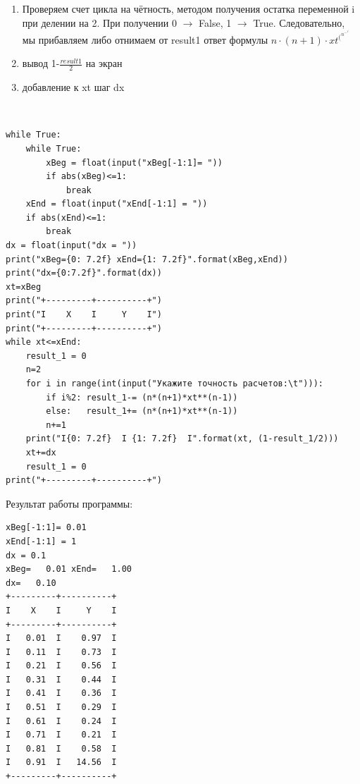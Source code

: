 \documentclass[a4paper]{article}
\begin{document}
\begin{lab3.3}
\begin{algoritm}
\begin{enumerate}
            \item Проверяем счет цикла на чётность, методом получения остатка переменной i при делении на 2. При получении 0 $\to$ False, 1 $\to$ True. Следовательно, мы прибавляем либо отнимаем от result1 ответ формулы $n\cdot(n+1)\cdot xt^(^n^-^1^)$
            \item вывод 1-$\frac{result1}{2}$ на экран
            \item добавление к xt шаг dx
        \end{enumerate}
    \end{algoritm}\\
    \begin{verbatim}
while True:
    while True:
        xBeg = float(input("xBeg[-1:1]= "))
        if abs(xBeg)<=1:
            break
    xEnd = float(input("xEnd[-1:1] = "))
    if abs(xEnd)<=1:
        break
dx = float(input("dx = "))
print("xBeg={0: 7.2f} xEnd={1: 7.2f}".format(xBeg,xEnd))
print("dx={0:7.2f}".format(dx))
xt=xBeg
print("+---------+----------+")
print("I    X    I     Y    I")
print("+---------+----------+")
while xt<=xEnd:
    result_1 = 0
    n=2
    for i in range(int(input("Укажите точность расчетов:\t"))):
        if i%2: result_1-= (n*(n+1)*xt**(n-1))
        else:   result_1+= (n*(n+1)*xt**(n-1))
        n+=1
    print("I{0: 7.2f}  I {1: 7.2f}  I".format(xt, (1-result_1/2)))
    xt+=dx
    result_1 = 0
print("+---------+----------+")

    \end{verbatim}
\begin{center}
    Результат работы программы:
    \begin{verbatim}
xBeg[-1:1]= 0.01
xEnd[-1:1] = 1
dx = 0.1
xBeg=   0.01 xEnd=   1.00
dx=   0.10
+---------+----------+
I    X    I     Y    I
+---------+----------+
I   0.01  I    0.97  I
I   0.11  I    0.73  I
I   0.21  I    0.56  I
I   0.31  I    0.44  I
I   0.41  I    0.36  I
I   0.51  I    0.29  I
I   0.61  I    0.24  I
I   0.71  I    0.21  I
I   0.81  I    0.58  I
I   0.91  I   14.56  I
+---------+----------+

    \end{verbatim}
\end{center}
    \end{lab3.3}
\end{document}
